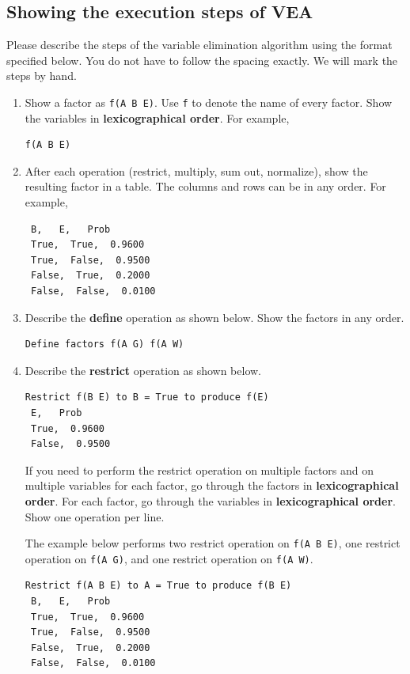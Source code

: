 \documentclass[12pt]{article}
\begin{document}
\newpage
\subsection{Showing the execution steps of VEA}
\label{sec:vea_steps}

Please describe the steps of the variable elimination algorithm using the format specified below. You do not have to follow the spacing exactly. We will mark the steps by hand.

\begin{enumerate}

\item 
Show a factor as \verb+f(A B E)+. Use \verb+f+ to denote the name of every factor. Show the variables in {\bf lexicographical order}. For example,
%
\begin{verbatim}
f(A B E)
\end{verbatim}

\item 
After each operation (restrict, multiply, sum out, normalize), show the resulting factor in a table. The columns and rows can be in any order. For example,
%
\begin{verbatim}
 B,   E,   Prob
 True,  True,  0.9600
 True,  False,  0.9500
 False,  True,  0.2000
 False,  False,  0.0100
\end{verbatim}


\item 
Describe the {\bf define} operation as shown below. Show the factors in any order.
%
\begin{verbatim}
Define factors f(A G) f(A W)
\end{verbatim}

\item
Describe the {\bf restrict} operation as shown below.  
\begin{verbatim}
Restrict f(B E) to B = True to produce f(E)
 E,   Prob
 True,  0.9600
 False,  0.9500
\end{verbatim}

If you need to perform the restrict operation on multiple factors and on multiple variables for each factor, go through the factors in {\bf lexicographical order}. For each factor, go through the variables in {\bf lexicographical order}. Show one operation per line. 

The example below performs two restrict operation on \verb+f(A B E)+, one restrict operation on \verb+f(A G)+, and one restrict operation on \verb+f(A W)+.
%
\begin{verbatim}
Restrict f(A B E) to A = True to produce f(B E)
 B,   E,   Prob
 True,  True,  0.9600
 True,  False,  0.9500
 False,  True,  0.2000
 False,  False,  0.0100


\end{verbatim}
\end{enumerate}
\end{document}
